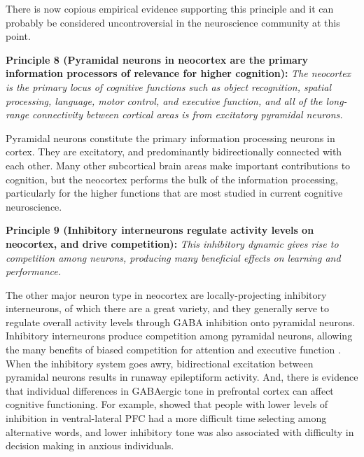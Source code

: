 \documentclass[11pt,twoside]{article}
\begin{document}
There is now copious empirical evidence supporting this principle and it can
probably be considered uncontroversial in the neuroscience community at this
point.

{\bf Principle 8 (Pyramidal neurons in neocortex are the primary information
  processors of relevance for higher cognition):} {\em The neocortex is the
  primary locus of cognitive functions such as object recognition, spatial
  processing, language, motor control, and executive function, and all of the
  long-range connectivity between cortical areas is from excitatory pyramidal
  neurons.} 

Pyramidal neurons constitute the primary information processing neurons in
cortex.  They are excitatory, and predominantly bidirectionally
connected with each other.  Many other subcortical brain areas make important
contributions to cognition, but the neocortex performs the bulk of the
information processing, particularly for the higher functions that are most
studied in current cognitive neuroscience.

{\bf Principle 9 (Inhibitory interneurons regulate activity levels on
  neocortex, and drive competition):} {\em This
  inhibitory dynamic gives rise to competition among neurons, producing many
  beneficial effects on learning and performance.}

The other major neuron type in neocortex are locally-projecting inhibitory
interneurons, of which there are a great variety, and they generally serve to
regulate overall activity levels through GABA inhibition onto pyramidal
neurons.  Inhibitory interneurons produce competition among pyramidal neurons,
allowing the many benefits of biased competition for attention and executive
function \cite{DesimoneDuncan95,HerdBanichOReilly06}.  When the inhibitory
system goes awry, bidirectional excitation between pyramidal neurons results
in runaway epileptiform activity. And, there is evidence that individual
differences in GABAergic tone in prefrontal cortex can affect cognitive
functioning.  For example,  showed that
people with lower levels of inhibition in ventral-lateral PFC had a more
difficult time selecting among alternative words, and lower inhibitory tone
was also associated with difficulty in decision making in anxious individuals.
\end{document}
